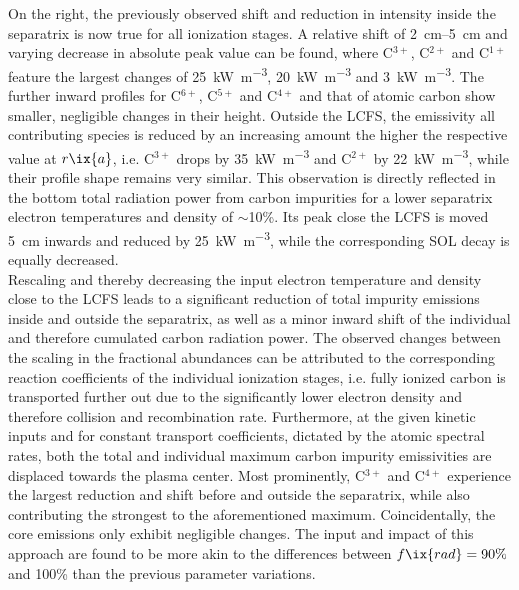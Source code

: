                 On the right, the previously observed shift and reduction in intensity inside the separatrix is now true for all ionization stages. A relative shift of \SIrange{2}{5}{\centi\meter} and varying decrease in absolute peak value can be found, where C$^{3+}$, C$^{2+}$ and C$^{1+}$ feature the largest changes of \SI{25}{\kilo\watt\per\cubic\meter}, \SI{20}{\kilo\watt\per\cubic\meter} and \SI{3}{\kilo\watt\per\cubic\meter}. The further inward profiles for C$^{6+}$, C$^{5+}$ and C$^{4+}$ and that of atomic carbon show smaller, negligible changes in their height. Outside the LCFS, the emissivity all contributing species is reduced by an increasing amount the higher the respective value at $r\ix{a}$, i.e. C$^{3+}$ drops by \SI{35}{\kilo\watt\per\cubic\meter} and C$^{2+}$ by \SI{22}{\kilo\watt\per\cubic\meter}, while their profile shape remains very similar. This observation is directly reflected in the bottom total radiation power from carbon impurities for a lower separatrix electron temperatures and density of $\sim$10\%. Its peak close the LCFS is moved \SI{5}{\centi\meter} inwards and reduced by \SI{25}{\kilo\watt\per\cubic\meter}, while the corresponding SOL decay is equally decreased.\\%
                Rescaling and thereby decreasing the input electron temperature and density close to the LCFS leads to a significant reduction of total impurity emissions inside and outside the separatrix, as well as a minor inward shift of the individual and therefore cumulated carbon radiation power. The observed changes between the scaling in the fractional abundances can be attributed to the corresponding reaction coefficients of the individual ionization stages, i.e. fully ionized carbon is transported further out due to the significantly lower electron density and therefore collision and recombination rate. Furthermore, at the given kinetic inputs and for constant transport coefficients, dictated by the atomic spectral rates, both the total and individual maximum carbon impurity emissivities are displaced towards the plasma center. Most prominently, C$^{3+}$ and C$^{4+}$ experience the largest reduction and shift before and outside the separatrix, while also contributing the strongest to the aforementioned maximum. Coincidentally, the core emissions only exhibit negligible changes. The input and impact of this approach are found to be more akin to the differences between $f\ix{rad}=90\%$ and 100\% than the previous parameter variations.\\%
%
                \newline%

